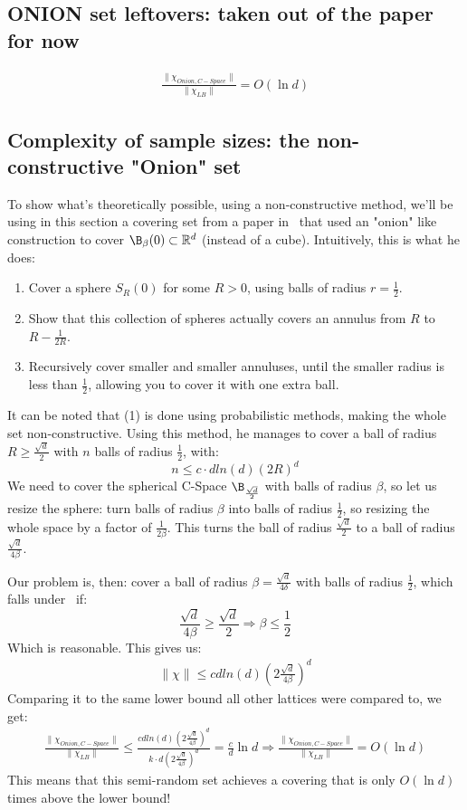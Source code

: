 \subsection{ONION set leftovers: taken out of the paper for now}

\begin{align*}
    \frac{\|\chi_{Onion, C-Space}\|}{\|\chi_{LB}\|} = O(\ln{d})
\end{align*}
\subsection*{Complexity of sample sizes: the non-constructive "Onion" set}

To show what's theoretically possible, using a non-constructive method, we'll be using in this section a covering set from a paper in~\cite{verger2005covering} that used an "onion" like construction to cover $\B_{\beta}(0)\subset\mathbb{R}^d$ (instead of a cube). Intuitively, this is what he does:
\begin{enumerate}
    \item Cover a sphere $S_{R}(0)$ for some $R>0$, using balls of radius $r=\frac{1}{2}$. 
    \item Show that this collection of spheres actually covers an annulus from $R$ to $R-\frac{1}{2R}$.
    \item Recursively cover smaller and smaller annuluses, until the smaller radius is less than $\frac{1}{2}$, allowing you to cover it with one extra ball.
\end{enumerate}
It can be noted that (1) is done using probabilistic methods, making the whole set non-constructive.
Using this method, he manages to cover a ball of radius $R\geq \frac{\sqrt{d}}{2}$ with $n$ balls of radius \(\frac{1}{2}\), with:
\[
    n \leq c\cdot dln(d)(2R)^d
\]
We need to cover the spherical C-Space $\B_\frac{\sqrt{d}}{2}$ with balls of radius $\beta$, so let us resize the sphere: turn balls of radius $\beta$ into balls of radius $\frac{1}{2}$, so resizing the whole space by a factor of $\frac{1}{2\beta}$. This turns the ball of radius $\frac{\sqrt{d}}{2}$ to a ball of radius $\frac{\sqrt{d}}{4\beta}$.


Our problem is, then: cover a ball of radius $\beta=\frac{\sqrt{d}}{4\delta}$ with balls of radius $\frac{1}{2}$, which falls under~\cite{verger2005covering} if:
\[
    \frac{\sqrt{d}}{4\beta} \geq \frac{\sqrt{d}}{2} \Rightarrow \beta \leq \frac{1}{2}
\]
Which is reasonable. This gives us:
\begin{align}
    \|\chi\|\leq cdln(d)(2\frac{\sqrt{d}}{4\beta})^d
\end{align}
Comparing it to the same lower bound all other lattices were compared to, we get:
\begin{align*}
    \frac{\|\chi_{Onion, C-Space}\|}{\|\chi_{LB}\|} \leq \frac{cdln(d)(2\frac{\sqrt{d}}{4\beta})^d}{k\cdot d (2\frac{\sqrt{d}}{4\beta})^d} =\frac{c}{d}\ln{d}
    \Rightarrow \frac{\|\chi_{Onion, C-Space}\|}{\|\chi_{LB}\|} = O(\ln{d})
\end{align*}
This means that this semi-random set achieves a covering that is only $O(\ln{d})$ times above the lower bound!

